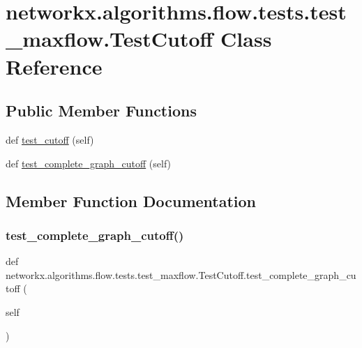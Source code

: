 \hypertarget{classnetworkx_1_1algorithms_1_1flow_1_1tests_1_1test__maxflow_1_1TestCutoff}{}\section{networkx.\+algorithms.\+flow.\+tests.\+test\+\_\+maxflow.\+Test\+Cutoff Class Reference}
\label{classnetworkx_1_1algorithms_1_1flow_1_1tests_1_1test__maxflow_1_1TestCutoff}
\subsection*{Public Member Functions}
\begin{DoxyCompactItemize}
\item 
def \hyperlink{classnetworkx_1_1algorithms_1_1flow_1_1tests_1_1test__maxflow_1_1TestCutoff_aa538d19f5bd07738bc67df10e9c5e095}{test\+\_\+cutoff} (self)
\item 
def \hyperlink{classnetworkx_1_1algorithms_1_1flow_1_1tests_1_1test__maxflow_1_1TestCutoff_aefe971e6ab73b41af9578633895dd11b}{test\+\_\+complete\+\_\+graph\+\_\+cutoff} (self)
\end{DoxyCompactItemize}


\subsection{Member Function Documentation}
\mbox{\label{classnetworkx_1_1algorithms_1_1flow_1_1tests_1_1test__maxflow_1_1TestCutoff_aefe971e6ab73b41af9578633895dd11b}} 
\subsubsection{\texorpdfstring{test\+\_\+complete\+\_\+graph\+\_\+cutoff()}{test\_complete\_graph\_cutoff()}}
{\footnotesize\ttfamily def networkx.\+algorithms.\+flow.\+tests.\+test\+\_\+maxflow.\+Test\+Cutoff.\+test\+\_\+complete\+\_\+graph\+\_\+cutoff (\begin{DoxyParamCaption}\item[{}]{self }\end{DoxyParamCaption})}


